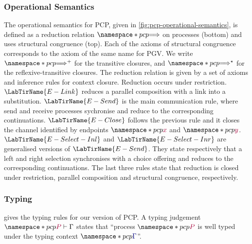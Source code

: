 \documentclass[main.tex]{subfiles}
\begin{document}
\subsubsection*{Operational Semantics}
The operational semantics for PCP, given in \cref{fig:pcp-operational-semantics}, is defined as a reduction relation $\pcp{\red}$ on processes (bottom) and uses structural congruence (top). Each of the axioms of structural congruence corresponds to the axiom of the same name for PGV. We write $\pcp{\red^+}$ for the transitive closures, and $\pcp{\red^\star}$ for the reflexive-transitive closures.
The reduction relation is given by a set of axioms and inference rules for context closure. Reduction occurs under restriction. $\LabTirName{E-Link}$ reduces a parallel composition with a link into a substitution. $\LabTirName{E-Send}$ is the main communication rule, where send and receive processes sychronise and reduce to the corresponding continuations. $\LabTirName{E-Close}$ follows the previous rule and it closes the channel identified by endpoints $\pcp{\tm{x}}$ and $\pcp{\tm{y}}$. $\LabTirName{E-Select-Inl}$ and $\LabTirName{E-Select-Inr}$ are generalised versions of $\LabTirName{E-Send}$. They state respectively that a left and right selection synchronises with a choice offering and reduces to the corresponding continuations. The last three rules state that reduction is closed under restriction, parallel composition and structural congruence, respectively. 



\subsubsection*{Typing}
 gives the typing rules for our version of PCP. A typing judgement $\pcp{\seq{P}{\Gamma}}$ states that ``process $\pcp{\tm{P}}$ is well typed under the typing context $\pcp{\ty{\Gamma}}$''.
\end{document}
